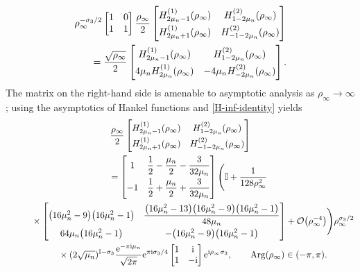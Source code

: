 \documentclass[11pt]{article}
\numberwithin{equation}{section}
\numberwithin{equation}{section}
\newcommand{\ee}{\mathrm{e}}
\newcommand{\ii}{\mathrm{i}}
\renewcommand{\arg}{\operatorname{Arg}}
\begin{document}
\begin{gather}
 \rho_\infty^{-\sigma_3/2} \begin{bmatrix} 1 & 0 \\ 1 & 1\end{bmatrix} \dfrac{\rho_\infty}{2} \begin{bmatrix}H_{2\mu_n - 1}^{(1)}(\rho_\infty) & H_{1 -2\mu_n}^{(2)}(\rho_\infty) \vspace{1mm}\\ H^{(1)}_{2\mu_n + 1}(\rho_\infty) & H_{-1 -2\mu_n}^{(2)}(\rho_\infty) \end{bmatrix}\nonumber\\
 \qquad= \dfrac{\sqrt{\rho_\infty}}{2} \begin{bmatrix} H_{2\mu_n-1}^{(1)}(\rho_\infty) & H_{1-2\mu_n}^{(2)}(\rho_\infty)\vspace{1mm}\\4\mu_n H_{2\mu_n}^{(1)}(\rho_\infty) & -4\mu_n H_{-2\mu_n}^{(2)}(\rho_\infty)\end{bmatrix}.\label{H-inf-identity}
\end{gather}
The matrix on the right-hand side is amenable to asymptotic analysis as $\rho_\infty \to \infty$; using the asymptotics of Hankel functions \cite[equations~(10.17.5) and (10.17.6)]{DLMF} and \eqref{H-inf-identity} yields
\begin{gather}
 \dfrac{\rho_\infty}{2} \begin{bmatrix}H_{2\mu_n - 1}^{(1)}(\rho_\infty) & H_{1 -2\mu_n}^{(2)}(\rho_\infty) \vspace{1mm}\\ H^{(1)}_{2\mu_n + 1}(\rho_\infty) & H_{-1 -2\mu_n}^{(2)}(\rho_\infty) \end{bmatrix}\nonumber\\
 \qquad= \begin{bmatrix} 1 & \dfrac{1}{2}-\dfrac{\mu_n}{2}-\dfrac{3}{32 \mu_n} \vspace{1mm}\\ -1 & \dfrac{1}{2} + \dfrac{\mu_n}{2}+\dfrac{3}{32 \mu_n}
\end{bmatrix} \Biggl( \mathbb{I}+ \dfrac{1}{128 \rho_\infty^2}  \nonumber\\
 \phantom{\qquad=}{}\times \begin{bmatrix} \big(16\mu_n^2 - 9\big)\big(16\mu_n^2 - 1\big) & \dfrac{\big(16 \mu_n^2 - 13\big)\big(16\mu_n^2 - 9\big)\big(16\mu_n^2 - 1\big)}{48\mu_n} \vspace{1mm}\\ 64\mu_n\big(16\mu_n^2 - 1\big) & - \big(16\mu_n^2 - 9\big)\big(16\mu_n^2 - 1\big)\end{bmatrix} + \mathcal{O}\big(\rho_\infty^{-4}\big)\Biggr) \rho_\infty^{\sigma_3/2} \nonumber\\
\phantom{\qquad=}{}\times (2\sqrt{\mu_n})^{\mathbb{I}-\sigma_3}{\dfrac{\ee^{-\pi \ii \mu_n}}{\sqrt{2\pi}}} {}{} \ee^{\pi \ii\sigma_3/4}\begin{bmatrix} 1 & \ii\\ 1 &-\ii \end{bmatrix} \ee^{\ii \rho_\infty \sigma_3}, \qquad \arg(\rho_\infty) \in (-\pi, \pi).\label{h-infty-asymptotics}
\end{gather}
\end{document}
